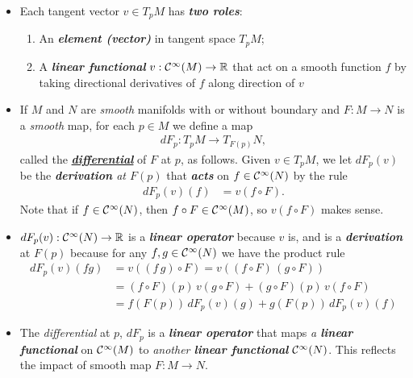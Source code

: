 \documentclass[11pt]{article}
\begin{document}
\begin{itemize}
\item \begin{remark}
Each tangent vector $v \in T_{p}M$ has \emph{\textbf{two roles}}:
\begin{enumerate}
\item An \emph{\textbf{element (vector)}} in tangent space $T_pM$; 
\item A \emph{\textbf{linear functional}} $v: {\mathcal C}^{\infty}(M) \rightarrow {\mathbb R}$ that act on a smooth function $f$ by taking directional derivatives of $f$ along direction of $v$
\end{enumerate}
\end{remark}

\item \begin{definition}
If $M$ and $N$ are \emph{smooth} manifolds with or without boundary and $F: M \rightarrow N$ is a \emph{smooth} map, for each $p \in M$ we define a map
\begin{align*}
dF_{p}: T_{p}M \rightarrow T_{F(p)}N ,
\end{align*} called the \underline{\emph{\textbf{differential}}} of $F$ at $p$, as follows. Given $v \in T_{p}M$, we let $dF_{p}(v)$ be the \emph{\textbf{derivation} at $F(p)$} that \emph{\textbf{acts}} on $f \in {\mathcal C}^{\infty}(N)$ by the rule 
\begin{align}
dF_{p}(v)(f) &= v(f \circ F). \label{eqn: differential_F_at_p}
\end{align} Note that if $f \in {\mathcal C}^{\infty}(N)$, then $f \circ F \in {\mathcal C}^{\infty}(M)$, so $v(f \circ F)$ makes sense. 
\end{definition}

\item \begin{remark}
$dF_{p}(v): {\mathcal C}^{\infty}(N) \rightarrow {\mathbb R}$ is a \emph{\textbf{linear operator}} because $v$ is, and is a \emph{\textbf{derivation}} at $F(p)$ because for any $f, g \in {\mathcal C}^{\infty}(N)$ we have the product rule
\begin{align*}
dF_{p}(v)(fg) &= v((f\,g)\circ F) = v((f\circ F)\,(g \circ F))\\
&= (f\circ F)(p)\,v(g \circ F) + (g \circ F)(p)\,v(f \circ F)\\
&= f(F(p))\,dF_{p}(v)(g) + g(F(p))\,dF_{p}(v)(f)
\end{align*}
\end{remark}

\item \begin{remark}
 The \emph{differential} at $p$, $dF_{p}$ is a \emph{\textbf{linear operator}} that maps \emph{a \textbf{linear functional}} on ${\mathcal C}^{\infty}(M)$ to \emph{another \textbf{linear functional}} ${\mathcal C}^{\infty}(N)$. This reflects the impact of smooth map $F: M \rightarrow N$.
\end{remark}


\end{itemize}
\end{document}
